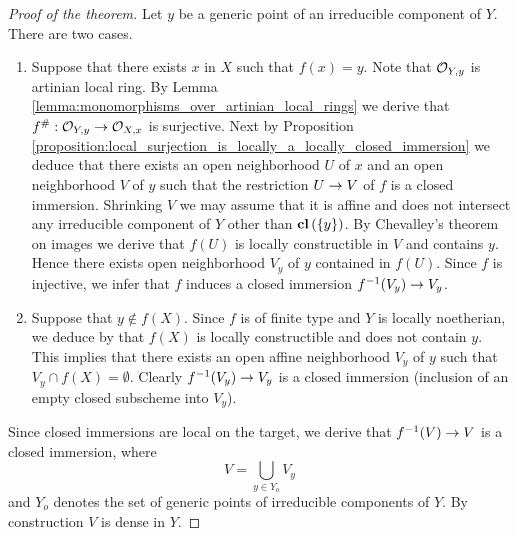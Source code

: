 \begin{proof}[Proof of the theorem]
Let $y$ be a generic point of an irreducible component of $Y$. There are two cases.
\begin{enumerate}[label=\textbf{(\arabic*)}, leftmargin=3.0em]
\item Suppose that there exists $x$ in $X$ such that $f(x) = y$. Note that ${\mathcal O}_{Y,y}$ is artinian local ring. By Lemma \ref{lemma:monomorphisms_over_artinian_local_rings} we derive that $f^{\#}:{\mathcal O}_{Y,y}\rightarrow {\mathcal O}_{X,x}$ is surjective. Next by Proposition \ref{proposition:local_surjection_is_locally_a_locally_closed_immersion} we deduce that there exists an open neighborhood $U$ of $x$ and an open neighborhood $V$ of $y$ such that the restriction $U\rightarrow V$ of $f$ is a closed immersion. Shrinking $V$ we may assume that it is affine and does not intersect any irreducible component of $Y$ other than $\mathbf{cl}\left(\{y\}\right)$. By Chevalley's theorem on images {\cite[Theorem 3.4]{Constructibleandlocallyconstructiblesets}} we derive that $f(U)$ is locally constructible in $V$ and contains $y$. Hence there exists open neighborhood $V_y$ of $y$ contained in $f(U)$. Since $f$ is injective, we infer that $f$ induces a closed immersion $f^{-1}(V_y)\rightarrow V_y$.
\item Suppose that $y\not \in f(X)$. Since $f$ is of finite type and $Y$ is locally noetherian, we deduce by {\cite[Theorem 3.4]{Constructibleandlocallyconstructiblesets}} that $f(X)$ is locally constructible and does not contain $y$. This implies that there exists an open affine neighborhood $V_y$ of $y$ such that $V_y\cap f(X) = \emptyset$. Clearly $f^{-1}(V_y)\rightarrow V_y$ is a closed immersion (inclusion of an empty closed subscheme into $V_y$).
\end{enumerate}
Since closed immersions are local on the target, we derive that $f^{-1}(V)\rightarrow V$ is a closed immersion, where
$$V = \bigcup_{y\in Y_o}V_y$$
and $Y_o$ denotes the set of generic points of irreducible components of $Y$. By construction $V$ is dense in $Y$.
\end{proof}

